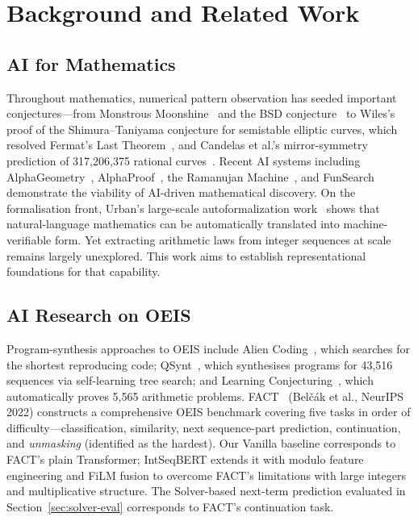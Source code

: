 
\section{Background and Related Work}
\label{sec:background}

\subsection{AI for Mathematics}
\label{sec:background:ai-math}

Throughout mathematics, numerical pattern observation has seeded important
conjectures---from Monstrous Moonshine~\cite{conway1979monstrous} and the
BSD conjecture~\cite{birch1965} to Wiles's proof of the Shimura--Taniyama conjecture
for semistable elliptic curves, which resolved Fermat's Last Theorem~\cite{wiles1995},
and Candelas et al.'s mirror-symmetry prediction of 317,206,375
rational curves~\cite{candelas1991}.
Recent AI systems including AlphaGeometry~\cite{trinh2024alphageometry},
AlphaProof~\cite{alphaproof2024}, the Ramanujan Machine~\cite{raayoni2021ramanujan}, and
FunSearch~\cite{romera2023funsearch} demonstrate the viability of AI-driven mathematical
discovery. On the formalisation front, Urban's large-scale autoformalization
work~\cite{urban-autoformalization} shows that natural-language mathematics can be
automatically translated into machine-verifiable form.
Yet extracting arithmetic laws from integer sequences at scale remains largely
unexplored. This work aims to establish representational foundations for that capability.

\subsection{AI Research on OEIS}
\label{sec:background:oeis}

Program-synthesis approaches to OEIS include Alien Coding~\cite{urban-alien-coding},
which searches for the shortest reproducing code; QSynt~\cite{gauthier2023qsynt}, which
synthesises programs for 43,516 sequences via self-learning tree search; and Learning
Conjecturing~\cite{gauthier2025conjecturing}, which automatically proves 5,565 arithmetic problems.
FACT~\cite{zurich-fact} (Bel\v{c}\'{a}k et al., NeurIPS 2022) constructs a comprehensive OEIS
benchmark covering five tasks in order of difficulty---classification, similarity,
next sequence-part prediction, continuation, and
\emph{unmasking} (identified as the hardest).
Our Vanilla baseline corresponds to FACT's plain Transformer; IntSeqBERT extends it with
modulo feature engineering and FiLM fusion to overcome FACT's limitations with large integers
and multiplicative structure. The Solver-based next-term prediction evaluated in
Section~\ref{sec:solver-eval} corresponds to FACT's continuation task.

